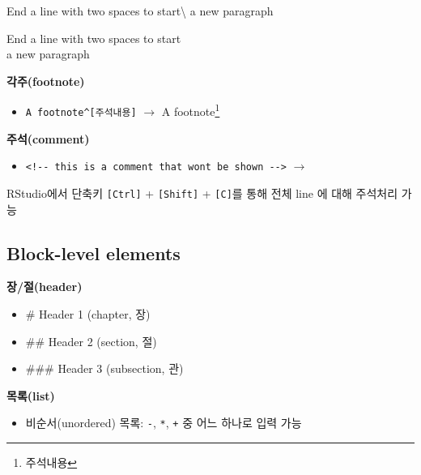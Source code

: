 \documentclass[
  11pt,
]{krantz}
\makeatletter
\newenvironment{Shaded}{\begin{snugshade}}{\end{snugshade}}
\newcommand{\NormalTok}[1]{#1}
\providecommand{\tightlist}{%
  \setlength{\itemsep}{0pt}\setlength{\parskip}{0pt}}
\newenvironment{kframe}{%
\medskip{}
\setlength{\fboxsep}{.8em}
 \def\at@end@of@kframe{}%
 \ifinner\ifhmode%
  \def\at@end@of@kframe{\end{minipage}}%
  \begin{minipage}{\columnwidth}%
 \fi\fi%
 \def\FrameCommand##1{\hskip\@totalleftmargin \hskip-\fboxsep
 \colorbox{shadecolor}{##1}\hskip-\fboxsep
     \hskip-\linewidth \hskip-\@totalleftmargin \hskip\columnwidth}%
 \MakeFramed {\advance\hsize-\width
   \@totalleftmargin\z@ \linewidth\hsize
   \@setminipage}}%
 {\par\unskip\endMakeFramed%
 \at@end@of@kframe}
\newenvironment{rmdblock}[1]
  {
  \begin{itemize}
  \renewcommand{\labelitemi}{
    \raisebox{-.7\height}[0pt][0pt]{
      {\setkeys{Gin}{width=3em,keepaspectratio}\texttt{[image: images/\#1]}}
    }
  }
  \setlength{\fboxsep}{1em}
  \begin{kframe}
  \item
  }
  {
  \end{kframe}
  \end{itemize}
  }
\newenvironment{rmdtip}
  {\begin{rmdblock}{tip}}
  {\end{rmdblock}}
\makeatother
\begin{document}
\begin{Shaded}
\begin{Highlighting}[]
\NormalTok{End a line with two spaces to start\textbackslash{}}
\NormalTok{a new paragraph}
\end{Highlighting}
\end{Shaded}

End a line with two spaces to start\\
a new paragraph

\textbf{각주(footnote)}

\begin{itemize}
\tightlist
\item
  \texttt{A\ footnote\^{}{[}주석내용{]}} \(\rightarrow\) A footnote\footnote{주석내용}
\end{itemize}

\textbf{주석(comment)}

\begin{itemize}
\tightlist
\item
  \texttt{\textless{}!-\/-\ this\ is\ a\ comment\ that\ won\textquotesingle{}t\ be\ shown\ -\/-\textgreater{}} \(\rightarrow\) 
\end{itemize}

\footnotesize

\begin{rmdtip}
RStudio에서 단축키 \texttt{{[}Ctrl{]}} + \texttt{{[}Shift{]}} + \texttt{{[}C{]}}를 통해 전체 line 에 대해 주석처리 가능
\end{rmdtip}

\normalsize

\hypertarget{block-level-elements}{%
\subsection{Block-level elements}\label{block-level-elements}}

\textbf{장/절(header)}

\begin{itemize}
\tightlist
\item
  \# Header 1 (chapter, 장)
\item
  \#\# Header 2 (section, 절)
\item
  \#\#\# Header 3 (subsection, 관)
\end{itemize}

\textbf{목록(list)}

\begin{itemize}
\tightlist
\item
  비순서(unordered) 목록: \texttt{-}, \texttt{*}, \texttt{+} 중 어느 하나로 입력 가능
\end{itemize}
\end{document}
